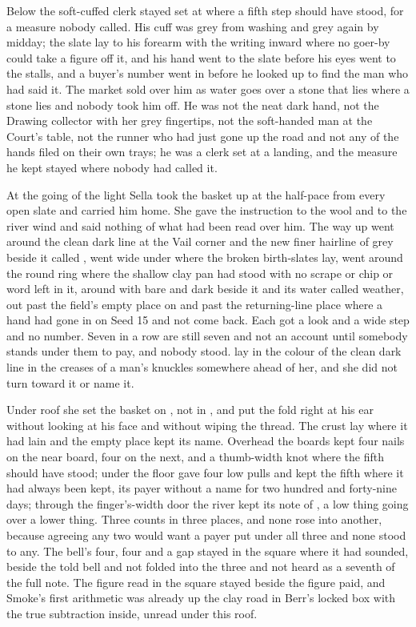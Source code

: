Below  the soft-cuffed clerk stayed set at  where a fifth step should have stood, for a measure nobody called. His cuff was grey from washing and grey again by midday; the slate lay to his forearm with the writing inward where no goer-by could take a figure off it, and his hand went to the slate before his eyes went to the stalls, and a buyer's number went in before he looked up to find the man who had said it. The market sold over him as water goes over a stone that lies where a stone lies and nobody took him off. He was not the neat dark hand, not the Drawing collector with her grey fingertips, not the soft-handed man at the Court's table, not the runner who had just gone up the road and not any of the hands filed on their own trays; he was a clerk set at a landing, and the measure he kept stayed where nobody had called it.

\scenebreak

At the going of the light Sella took the basket up at the half-pace from every open slate and carried him home. She gave the instruction to the wool and to the river wind and said nothing of what had been read over him. The way up went around the clean dark line at the Vail corner and the new finer hairline of grey beside it called , went wide under  where the broken birth-slates lay, went around the round ring where the shallow clay pan had stood with no scrape or chip or word left in it, around  with  bare and dark beside it and its water called weather, out past the field's empty place on  and past the returning-line place where a hand had gone in on Seed 15 and not come back. Each got a look and a wide step and no number. Seven in a row are still seven and not an account until somebody stands under them to pay, and nobody stood.  lay in the colour of the clean dark line in the creases of a man's knuckles somewhere ahead of her, and she did not turn toward it or name it.

Under  roof she set the basket on , not in , and put the fold right at his ear without looking at his face and without wiping the thread. The crust lay where it had lain and the empty place kept its name. Overhead the boards kept four nails on the near board, four on the next, and a thumb-width knot where the fifth should have stood; under the floor  gave four low pulls and kept the fifth where it had always been kept, its payer without a name for two hundred and forty-nine days; through the finger's-width door the river kept its note of , a low thing going over a lower thing. Three counts in three places, and none rose into another, because agreeing any two would want a payer put under all three and none stood to any. The bell's four, four and a gap stayed in the square where it had sounded, beside the told bell and not folded into the three and not heard as a seventh of the full note. The figure read in the square stayed beside the figure paid, and Smoke's first arithmetic was already up the clay road in Berr's locked box with the true subtraction inside, unread under this roof.

